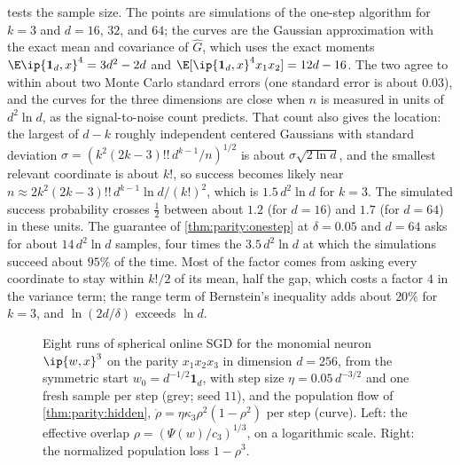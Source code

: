 \begin{refsection}
 tests the sample size. The points are simulations of the one-step algorithm for $k=3$ and $d=16$, $32$, and $64$; the curves are the Gaussian approximation with the exact mean and covariance of $\hat G$, which uses the exact moments $\E\ip{\mathbf 1_d,x}^4=3d^2-2d$ and $\E[\ip{\mathbf 1_d,x}^4x_1x_2]=12d-16$. The two agree to within about two Monte Carlo standard errors (one standard error is about $0.03$), and the curves for the three dimensions are close when $n$ is measured in units of $d^2\ln d$, as the signal-to-noise count predicts. That count also gives the location: the largest of $d-k$ roughly independent centered Gaussians with standard deviation $\sigma=(k^2(2k-3)!!\,d^{k-1}/n)^{1/2}$ is about $\sigma\sqrt{2\ln d}$, and the smallest relevant coordinate is about $k!$, so success becomes likely near $n\approx2k^2(2k-3)!!\,d^{k-1}\ln d/(k!)^2$, which is $1.5\,d^2\ln d$ for $k=3$. The simulated success probability crosses $\frac12$ between about $1.2$ (for $d=16$) and $1.7$ (for $d=64$) in these units. The guarantee of \cref{thm:parity:onestep} at $\delta=0.05$ and $d=64$ asks for about $14\,d^2\ln d$ samples, four times the $3.5\,d^2\ln d$ at which the simulations succeed about $95\%$ of the time. Most of the factor comes from asking every coordinate to stay within $k!/2$ of its mean, half the gap, which costs a factor $4$ in the variance term; the range term of Bernstein's inequality adds about $20\%$ for $k=3$, and $\ln(2d/\delta)$ exceeds $\ln d$.

\begin{figure}[t]
\centering
{}
\caption{Eight runs of spherical online SGD for the monomial neuron $\ip{w,x}^3$ on the parity $x_1x_2x_3$ in dimension $d=256$, from the symmetric start $w_0=d^{-1/2}\mathbf 1_d$, with step size $\eta=0.05\,d^{-3/2}$ and one fresh sample per step (grey; seed $11$), and the population flow of \cref{thm:parity:hidden}, $\dot\rho=\eta\kappa_3\rho^2(1-\rho^2)$ per step (curve). Left: the effective overlap $\rho=(\Psi(w)/c_3)^{1/3}$, on a logarithmic scale. Right: the normalized population loss $1-\rho^3$.}\label{fig:parity:neuron}
\end{figure}


\end{refsection}
